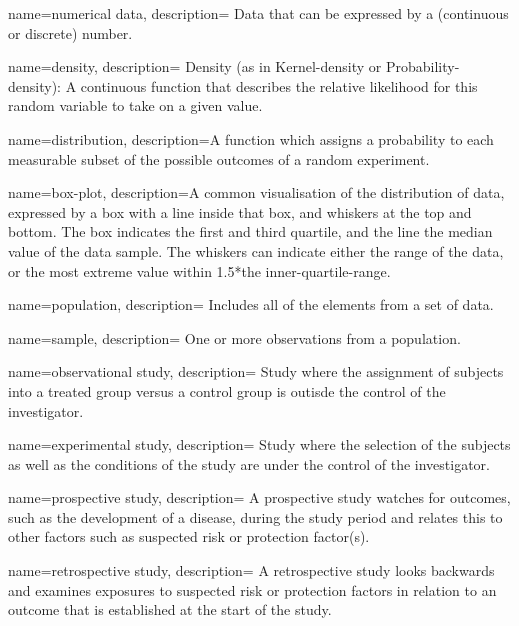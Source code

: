 {
    name=numerical data,
    description={ Data that can be expressed by a (continuous or discrete)
    number.}
}

{
    name=density,
    description={ Density (as in Kernel-density or Probability-density): A continuous function that describes the relative likelihood for this
    random variable to take on a given value.}
}

{
        name=distribution,
        description={A function which assigns a probability to each measurable subset of the possible outcomes of a random experiment.}
}

{
    name=box-plot,
    description={A common visualisation of the distribution of data, expressed by a box
    with a line inside that box, and whiskers at the top and bottom.
    The box indicates the first and third quartile, and the line the median
    value of the data sample. The whiskers can indicate either the range of
    the data, or the most extreme value within 1.5*the inner-quartile-range.}
}

{
    name=population,
    description={ Includes all of the elements from a set of data.}
}

{
    name=sample,
    description={ One or more observations from a population.}
}

{
    name=observational study,
    description={ Study where the assignment of subjects into a treated group versus a
    control group is outisde the control of the investigator.}
}

{
    name=experimental study,
    description={ Study where the selection of the subjects as well as the conditions of the
    study are under the control of the investigator.}
}

{
    name=prospective study,
    description={ A prospective study watches for outcomes, such as the development of a
    disease, during the study period and relates this to other factors such as
    suspected risk or protection factor(s).}
}

{
    name=retrospective study,
    description={ A retrospective study looks backwards and examines exposures to suspected
    risk or protection factors in relation to an outcome that is established
    at the start of the study. }
}

